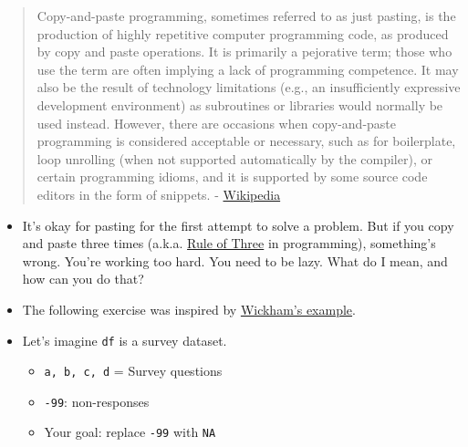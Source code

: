 \documentclass[
]{book}
\begin{document}
\begin{quote}
Copy-and-paste programming, sometimes referred to as just pasting, is the production of highly repetitive computer programming code, as produced by copy and paste operations. It is primarily a pejorative term; those who use the term are often implying a lack of programming competence. It may also be the result of technology limitations (e.g., an insufficiently expressive development environment) as subroutines or libraries would normally be used instead. However, there are occasions when copy-and-paste programming is considered acceptable or necessary, such as for boilerplate, loop unrolling (when not supported automatically by the compiler), or certain programming idioms, and it is supported by some source code editors in the form of snippets. - \href{https://en.wikipedia.org/wiki/Copy-and-paste_programming}{Wikipedia}
\end{quote}

\begin{itemize}
\item
  It's okay for pasting for the first attempt to solve a problem. But if you copy and paste three times (a.k.a. \href{https://en.wikipedia.org/wiki/Rule_of_three_(computer_programming)}{Rule of Three} in programming), something's wrong. You're working too hard. You need to be lazy. What do I mean, and how can you do that?
\item
  The following exercise was inspired by \href{http://adv-r.had.co.nz/Functional-programming.html}{Wickham's example}.
\item
  Let's imagine \texttt{df} is a survey dataset.

  \begin{itemize}
  \item
    \texttt{a,\ b,\ c,\ d} = Survey questions
  \item
    \texttt{-99}: non-responses
  \item
    Your goal: replace \texttt{-99} with \texttt{NA}
  \end{itemize}
\end{itemize}
\end{document}
